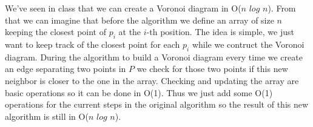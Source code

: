 We've seen in class that we can create a Voronoi diagram in O($n$ $log$ $n$). From that we can imagine that before the algorithm we define an array of size $n$ keeping the closest point of $p_i$ at the $i$-th position. The idea is simple, we just want to keep track of the closest point for each $p_i$ while we contruct the Voronoi diagram. During the algorithm to build a Voronoi diagram every time we create an edge separating two points in $P$ we check for those two points if this new neighbor is closer to the one in the array. Checking and updating the array are basic operations so it can be done in O(1). Thus we just add some O(1) operations for the current steps in the original algorithm so the result of this new algorithm is still in O($n$ $log$ $n$).
